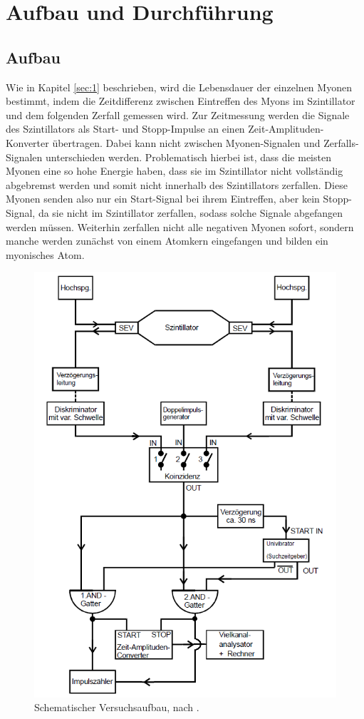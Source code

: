 \section{Aufbau und Durchführung}
\subsection{Aufbau}
Wie in Kapitel \ref{sec:1} beschrieben, wird die Lebensdauer der einzelnen Myonen bestimmt, indem die Zeitdifferenz zwischen Eintreffen
des Myons im Szintillator und dem folgenden Zerfall gemessen wird. Zur Zeitmessung werden die Signale des Szintillators als
Start- und Stopp-Impulse an einen Zeit-Amplituden-Konverter übertragen. Dabei kann nicht zwischen Myonen-Signalen und Zerfalls-Signalen
unterschieden werden. Problematisch hierbei ist, dass die meisten Myonen eine so hohe Energie haben, dass
sie im Szintillator nicht vollständig abgebremst werden und somit nicht innerhalb des Szintillators zerfallen.
Diese Myonen senden also nur ein Start-Signal bei ihrem Eintreffen, aber kein Stopp-Signal, da sie nicht im Szintillator zerfallen,
sodass solche Signale abgefangen werden müssen. Weiterhin zerfallen nicht alle negativen Myonen sofort,
sondern manche werden zunächst von einem Atomkern eingefangen und bilden ein myonisches Atom.

\begin{figure}[h]
  \centering
  \includegraphics[scale=1.2]{graphics/aufbau.png}
  \caption{Schematischer Versuchsaufbau, nach \cite{anleitung}.}
  \label{fig:aufbau}
\end{figure}

